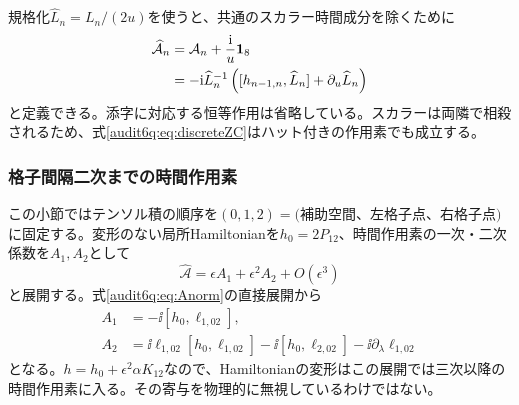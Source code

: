 規格化$\widehat L_n=L_n/(2u)$を使うと、共通のスカラー時間成分を除くために
\begin{align}
\widehat{\mathcal A}_n&=\mathcal A_n+\frac{\mathrm i}{u}\mathbf 1_{8}
\nonumber\\
&=-\mathrm i\widehat L_n^{-1}
\left([h_{n-1,n},\widehat L_n]+\partial_u\widehat L_n\right)
\label{audit6q:eq:Anorm}
\end{align}
と定義できる。添字に対応する恒等作用は省略している。スカラーは両隣で相殺されるため、式\eqref{audit6q:eq:discreteZC}はハット付きの作用素でも成立する。

\subsubsection{格子間隔二次までの時間作用素}
この小節ではテンソル積の順序を$(0,1,2)=($補助空間、左格子点、右格子点$)$に固定する。変形のない局所Hamiltonianを$h_0=2P_{12}$、時間作用素の一次・二次係数を$A_1,A_2$として
\begin{equation}
\widehat{\mathcal A}=\epsilon A_1+\epsilon^2 A_2+O(\epsilon^3)
\label{audit6q:eq:Aseries}
\end{equation}
と展開する。式\eqref{audit6q:eq:Anorm}の直接展開から
\begin{align}
A_1&=-\ii[h_0,\ell_{1,02}],
\label{audit6q:eq:A1}\\
A_2&=\ii\ell_{1,02}[h_0,\ell_{1,02}]
-\ii[h_0,\ell_{2,02}]-\ii\partial_\lambda\ell_{1,02}
\label{audit6q:eq:A2}
\end{align}
となる。$h=h_0+\epsilon^2\alpha K_{12}$なので、Hamiltonianの変形はこの展開では三次以降の時間作用素に入る。その寄与を物理的に無視しているわけではない。

